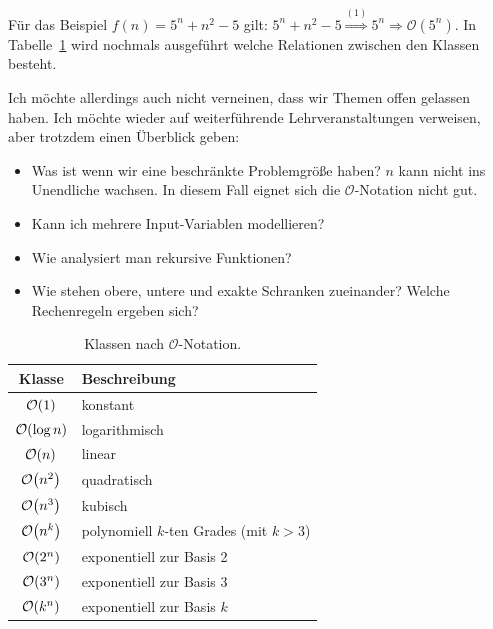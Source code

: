 Für das Beispiel $f(n) = 5^n + n^2 - 5$ gilt: $5^n + n^2 - 5 \stackrel{(1)}{\Rightarrow} 5^n  \Rightarrow \mathcal{O}(5^n)$. In Tabelle~\ref{tab:classes} wird nochmals ausgeführt welche Relationen zwischen den Klassen besteht.

Ich möchte allerdings auch nicht verneinen, dass wir Themen offen gelassen haben. Ich möchte wieder auf weiterführende Lehrveranstaltungen verweisen, aber trotzdem einen Überblick geben:
\begin{itemize}
  \item Was ist wenn wir eine beschränkte Problemgröße haben? $n$ kann nicht ins Unendliche wachsen. In diesem Fall eignet sich die $\mathcal{O}$-Notation nicht gut.
  \item Kann ich mehrere Input-Variablen modellieren?
  \item Wie analysiert man rekursive Funktionen?
  \item Wie stehen obere, untere und exakte Schranken zueinander? Welche Rechenregeln ergeben sich?
\end{itemize}
%
\begin{table}[ht]
 \begin{center}
  \begin{tabular}{cl}
   Klasse & Beschreibung \\
  \hline
   $\mathcal{O}\!\left(1\right)$ & konstant \\
   $\mathcal{O}\!\left(\log{n}\right)$ & logarithmisch \\
   $\mathcal{O}\!\left(n\right)$ & linear \\
   $\mathcal{O}\!\left(n^2\right)$ & quadratisch \\
   $\mathcal{O}\!\left(n^3\right)$ & kubisch \\
   $\mathcal{O}\!\left(n^k\right)$ & polynomiell $k$-ten Grades (mit $k>3$) \\
   $\mathcal{O}\!\left(2^n\right)$ & exponentiell zur Basis 2 \\
   $\mathcal{O}\!\left(3^n\right)$ & exponentiell zur Basis 3 \\
   $\mathcal{O}\!\left(k^n\right)$ & exponentiell zur Basis $k$ \\
  \end{tabular}
  \caption{Klassen nach $\mathcal{O}$-Notation.}
  \label{tab:classes}
 \end{center}
\end{table}

